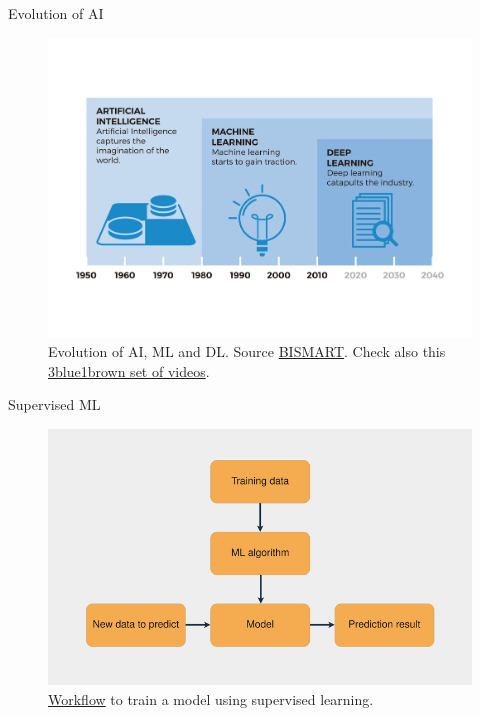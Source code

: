 \documentclass{beamer}
\begin{document}
\begin{frame}{Evolution of AI}
    \begin{figure}
        \includegraphics[width=0.7\linewidth]{MLDLevol}
        \caption{Evolution of AI, ML and DL. Source \href{https://blog.bismart.com/diferencia-machine-learning-deep-learning}{BISMART}. Check also this \href{https://www.3blue1brown.com/topics/neural-networks}{3blue1brown set of videos}.}
        \label{Fig:MLDLevol}
    \end{figure}
\end{frame}

\begin{frame}{Supervised ML}
    \begin{figure}
        \includegraphics[width=0.9\linewidth]{ML}
        \caption{\href{https://realpython.com/python-ai-neural-network/}{Workflow} to train a model using supervised learning.}
        \label{Fig:ML}
    \end{figure}
\end{frame}
\end{document}
